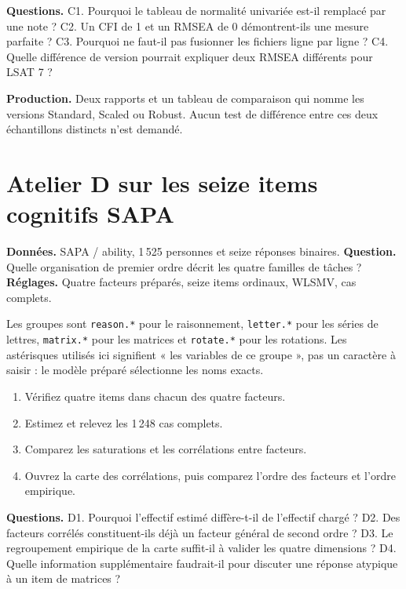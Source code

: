 \documentclass[
  french,
  11pt,
  a4paper,
  DIV=11,
  numbers=noendperiod]{scrreprt}
\providecommand{\tightlist}{%
  \setlength{\itemsep}{0pt}\setlength{\parskip}{0pt}}
\begin{document}
\textbf{Questions.} C1. Pourquoi le tableau de normalité univariée
est-il remplacé par une note ? C2. Un CFI de 1 et un RMSEA de 0
démontrent-ils une mesure parfaite ? C3. Pourquoi ne faut-il pas
fusionner les fichiers ligne par ligne ? C4. Quelle différence de
version pourrait expliquer deux RMSEA différents pour LSAT 7 ?

\textbf{Production.} Deux rapports et un tableau de comparaison qui
nomme les versions Standard, Scaled ou Robust. Aucun test de différence
entre ces deux échantillons distincts n'est demandé.

\section{Atelier D sur les seize items cognitifs
SAPA}\label{atelier-d-sur-les-seize-items-cognitifs-sapa}

\textbf{Données.} SAPA / ability, 1\,525 personnes et seize réponses
binaires. \textbf{Question.} Quelle organisation de premier ordre décrit
les quatre familles de tâches ? \textbf{Réglages.} Quatre facteurs
préparés, seize items ordinaux, WLSMV, cas complets.

Les groupes sont \texttt{reason.*} pour le raisonnement,
\texttt{letter.*} pour les séries de lettres, \texttt{matrix.*} pour les
matrices et \texttt{rotate.*} pour les rotations. Les astérisques
utilisés ici signifient « les variables de ce groupe », pas un caractère
à saisir : le modèle préparé sélectionne les noms exacts.

\begin{enumerate}
\def\labelenumi{\arabic{enumi}.}
\tightlist
\item
  Vérifiez quatre items dans chacun des quatre facteurs.
\item
  Estimez et relevez les 1\,248 cas complets.
\item
  Comparez les saturations et les corrélations entre facteurs.
\item
  Ouvrez la carte des corrélations, puis comparez l'ordre des facteurs
  et l'ordre empirique.
\end{enumerate}

\textbf{Questions.} D1. Pourquoi l'effectif estimé diffère-t-il de
l'effectif chargé ? D2. Des facteurs corrélés constituent-ils déjà un
facteur général de second ordre ? D3. Le regroupement empirique de la
carte suffit-il à valider les quatre dimensions ? D4. Quelle information
supplémentaire faudrait-il pour discuter une réponse atypique à un item
de matrices ?
\end{document}
